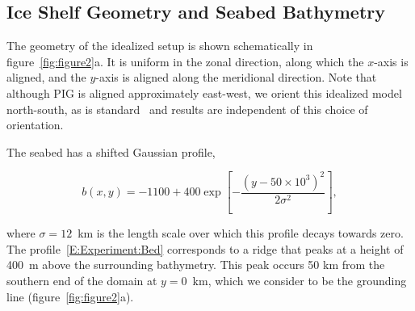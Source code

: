 \documentclass[draft]{agujournal2019}
\begin{document}
\subsection{Ice Shelf Geometry and Seabed Bathymetry}\label{S:Experiment:Geometry}
The geometry of the idealized setup is shown schematically in figure~\ref{fig:figure2}a. It is uniform in the zonal direction, along which the $x$-axis is aligned, and the $y$-axis is aligned along the meridional direction. Note that although PIG is aligned approximately east-west, we orient this idealized model north-south, as is standard~\cite{Grosfeld1997JGROceans, DeRydt2014JGeophysResOceans} and results are independent of this choice of orientation.

The seabed has a shifted Gaussian profile,
\begin{linenomath*}
\begin{equation}\label{E:Experiment:Bed}
    b(x,y) = -1100 + 400 \exp\left[-\frac{\left(y - 50\times 10^3\right)^2}{2\sigma^2}\right],
\end{equation}
\end{linenomath*}
where $\sigma = 12$~km is the length scale over which this profile decays towards zero. The profile~\eqref{E:Experiment:Bed} corresponds to a ridge that peaks at a height of 400~m above the surrounding bathymetry. This peak occurs 50 km from the southern end of the domain at $y=0$~km, which we consider to be the grounding line (figure~\ref{fig:figure2}a).
\end{document}

